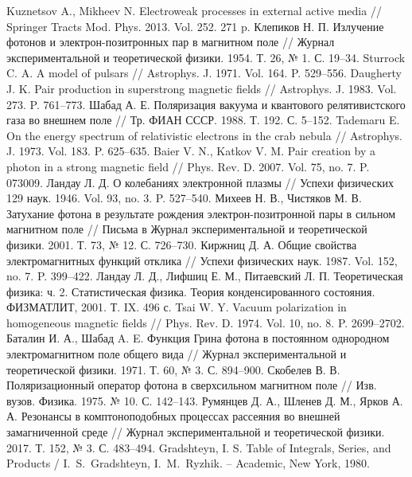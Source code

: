 \documentclass[14pt, russian]{article}
\begin{document}
\begin{thebibliography}{}
Kuznetsov A., Mikheev N. Electroweak processes in external active media //
Springer Tracts Mod. Phys. 2013. Vol. 252. 271 p.
%
Клепиков Н. П. Излучение фотонов и электрон-позитронных пар в магнитном
поле // Журнал экспериментальной и теоретической физики. 1954.
Т. 26, № 1. С. 19–34.
%
Sturrock C. A. A model of pulsars // Astrophys. J. 1971. Vol. 164. P. 529–556.
%
Daugherty J. K. Pair production in superstrong magnetic fields // Astrophys.
J. 1983. Vol. 273. P. 761–773.
%
Шабад А. Е. Поляризация вакуума и квантового релятивистского газа во
внешнем поле // Тр. ФИАН СССР. 1988. Т. 192. С. 5–152.
%
Tademaru E. On the energy spectrum of relativistic electrons in the crab nebula
// Astrophys. J. 1973. Vol. 183. P. 625–635.
%
Baier V. N., Katkov V. M. Pair creation by a photon in a strong magnetic
field // Phys. Rev. D. 2007. Vol. 75, no. 7. P. 073009.
%
Ландау Л. Д. О колебаниях электронной плазмы // Успехи физических
129 наук. 1946. Vol. 93, no. 3. P. 527–540.
%
Михеев Н. В., Чистяков М. В. Затухание фотона в результате рождения
электрон-позитронной пары в сильном магнитном поле // Письма в
Журнал экспериментальной и теоретической физики. 2001. Т. 73, № 12.
С. 726–730.
%
Киржниц Д. А. Общие свойства электромагнитных функций отклика //
Успехи физических наук. 1987. Vol. 152, no. 7. P. 399–422.
%
Ландау Л. Д., Лифшиц Е. М., Питаевский Л. П. Теоретическая физика:
ч. 2. Статистическая физика. Теория конденсированного состояния. ФИЗМАТЛИТ,
2001. Т. IX. 496 с.
%
Tsai W. Y. Vacuum polarization in homogeneous magnetic fields // Phys.
Rev. D. 1974. Vol. 10, no. 8. P. 2699–2702.
%
Баталин И. А., Шабад A. E. Функция Грина фотона в постоянном однородном
электромагнитном поле общего вида // Журнал экспериментальной
и теоретической физики. 1971. Т. 60, № 3. С. 894–900.
%
Скобелев В. В. Поляризационный оператор фотона в сверхсильном магнитном
поле // Изв. вузов. Физика. 1975. № 10. С. 142–143.
%
Румянцев Д. А., Шленев Д. М., Ярков А. А. Резонансы в комптоноподобных
процессах рассеяния во внешней замагниченной среде // Журнал экспериментальной
и теоретической физики. 2017. Т. 152, № 3. С. 483–494.
%
%
Gradshteyn, I. S. Table of Integrals, Series, and Products / I.~S.~Gradshteyn, I.~M.~Ryzhik. -- Academic, New York, 1980.

\end{thebibliography}
\end{document}

